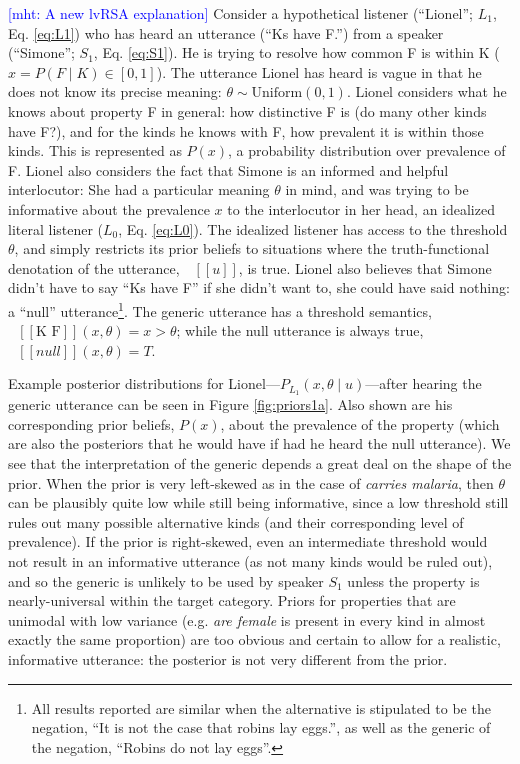 \documentclass[10pt,letterpaper]{article}
\newcommand{\denote}[1]{\mbox{ $[\![ #1 ]\!]$}}
\newcommand{\mht}[1]{\textcolor{Blue}{[mht: #1]}}
\begin{document}
\mht{A new lvRSA explanation}
Consider a hypothetical listener (``Lionel''; $L_{1}$, Eq. \ref{eq:L1}) who has heard an utterance (``Ks have F.'') from a speaker (``Simone''; $S_{1}$, Eq. \ref{eq:S1}). 
He is trying to resolve how common F is within K ($x = P(F\mid K) \in [0, 1]$). 
The utterance Lionel has heard is vague in that he does not know its precise meaning: $\theta \sim \text{Uniform}(0,1)$.
Lionel considers what he knows about property F in general: how distinctive F is (do many other kinds have F?), and for the kinds he knows with F, how prevalent it is within those kinds.
This is represented as $P(x)$, a probability distribution over prevalence of F.
Lionel also considers the fact that Simone is an informed and helpful interlocutor: She had a particular meaning $\theta$ in mind, and was trying to be informative about the prevalence $x$ to the interlocutor in her head, an idealized literal listener ($L_{0}$, Eq. \ref{eq:L0}).
The idealized listener has access to the threshold $\theta$, and simply restricts its prior beliefs to situations where the truth-functional denotation of the utterance, $\denote{u}$, is true.
Lionel also believes that Simone didn't have to say ``Ks have F'' if she didn't want to, she could have said nothing: a ``null'' utterance\footnote{All results reported are similar when the alternative is stipulated to be the negation,  ``It is not the case that robins lay eggs.'', as well as the generic of the negation, ``Robins do not lay eggs''.}. 
The generic utterance has a threshold semantics, $\denote{\text{K F}}(x, \theta)=x>\theta$; while the null utterance is always true, $\denote{null}(x, \theta)=T$.



Example posterior distributions for Lionel---$P_{L_{1}}(x , \theta \mid u)$---after hearing the generic utterance can be seen in Figure \ref{fig:priors1a}. 
Also shown are his corresponding prior beliefs, $P(x)$, about the prevalence of the property (which are also the posteriors that he would have if had he heard the null utterance).
We see that the interpretation of the generic depends a great deal on the shape of the prior.
When the prior is very left-skewed as in the case of \emph{carries malaria}, then $\theta$ can be plausibly quite low while still being informative, since a low threshold still rules out many possible alternative kinds (and their corresponding level of prevalence).
If the prior is right-skewed, even an intermediate threshold would not result in an informative utterance (as not many kinds would be ruled out), and so the generic is unlikely to be used by speaker $S_1$ unless the property is nearly-universal within the target category. 
Priors for properties that are unimodal with low variance (e.g. \emph{are female} is present in every kind in almost exactly the same proportion) are too obvious and certain to allow for a realistic, informative utterance: the posterior is not very different from the prior. 
\end{document}
